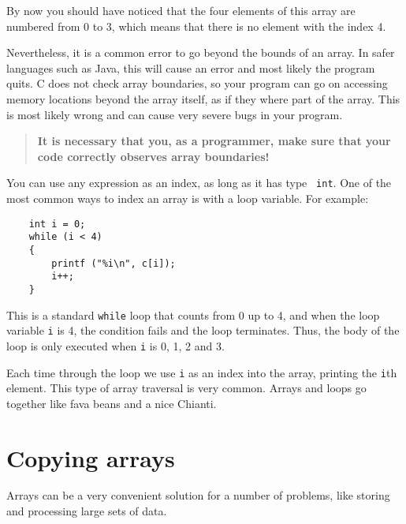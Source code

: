 By now you should have noticed that the four elements of this array
are numbered from 0 to 3, which means that there is no element with
the index 4.  

Nevertheless, it is a common error to go
beyond the bounds of an array. In safer languages such as Java, this will cause an 
error and most likely the program quits. C does not check array boundaries, so
your program can go on accessing memory locations beyond the array itself, as if 
they where part of the array. This is most likely wrong and can cause very
severe bugs in your program. 
\begin{quote}

{\bf It is necessary that you, as a programmer,
make sure that your code correctly observes array boundaries!}

\end{quote}





You can use any expression as an index, as long as it has type {\tt
int}.  One of the most common ways to index an array is with a loop
variable.  For example:

\begin{verbatim}
    int i = 0;
    while (i < 4) 
    {
        printf ("%i\n", c[i]);
        i++;
    }
\end{verbatim}

%
This is a standard {\tt while} loop that counts from 0
up to 4, and when the loop variable {\tt i} is 4, the
condition fails and the loop terminates.  Thus, the body
of the loop is only executed when {\tt i} is 0, 1, 2 and 3.


Each time through the loop we use {\tt i} as an index into
the array, printing the {\tt i}th element.  This type of
array traversal is very common.  Arrays and loops go together
like fava beans and a nice Chianti.


\section{Copying arrays}

Arrays can be a very convenient solution for a number of problems, like
storing and processing large sets of data.

